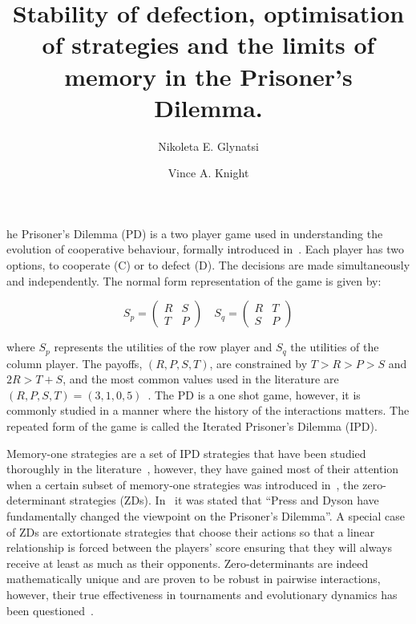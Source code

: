 \documentclass[9pt,twocolumn,twoside,lineno]{pnas-new}
\title{Stability of defection, optimisation of strategies and the limits of
memory in the Prisoner's Dilemma.}
\author[a, 1, 2]{Nikoleta E. Glynatsi}
\author[a, 1]{Vince A. Knight}
\affil[a]{Cardiff University, School of Mathematics, Cardiff, United Kingdom}
\begin{document}
\maketitle
\thispagestyle{firststyle}

he Prisoner's Dilemma (PD) is a two player game used in understanding the
evolution of cooperative behaviour, formally introduced in~\cite{Flood1958}.
Each player has two options, to cooperate (C) or to defect (D). The decisions
are made simultaneously and independently. The normal form representation of the
game is given by:

\begin{equation}\label{equ:pd_definition}
    S_p =
    \begin{pmatrix}
        R & S  \\
        T & P
    \end{pmatrix}
    \quad
    S_q =
    \begin{pmatrix}
        R & T  \\
        S & P
    \end{pmatrix}
\end{equation}

where \(S_p\) represents the utilities of the row player and \(S_q\) the
utilities of the column player. The payoffs, \((R, P, S, T)\), are constrained
by \(T > R > P > S\) and \(2R > T + S\), and the most common values used in the
literature are \((R, P, S, T) = (3, 1, 0, 5)\)~\cite{Axelrod1981}.
The PD is a one shot game, however, it is commonly studied in a manner where the
history of the interactions matters. The repeated form of the game is called the
Iterated Prisoner's Dilemma (IPD).

Memory-one strategies are a set of IPD strategies that have been
studied thoroughly in the literature~\cite{Nowak1990, Nowak1993}, however, they have gained
most of their attention when a certain subset of memory-one strategies was
introduced in~\cite{Press2012}, the zero-determinant strategies (ZDs). In~\cite{Stewart2012} it
was stated that ``Press and Dyson have fundamentally changed the viewpoint on
the Prisoner's Dilemma''.
A special case of ZDs are extortionate strategies that choose their actions so that a linear relationship is forced
between the players' score ensuring that they will always
receive at least as much as their opponents. Zero-determinants are
indeed mathematically unique and are proven to be robust in pairwise
interactions, however, their true effectiveness in tournaments and
evolutionary dynamics has been questioned~\cite{adami2013, Hilbe2013b,
Hilbe2013, Hilbe2015, Knight2018, Harper2015}.
\end{document}
